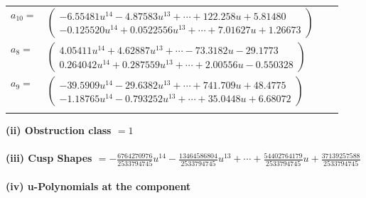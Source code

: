 \documentclass[1p]{elsarticle_modified}
\theoremstyle{definition}
\begin{document}
\begin{tabular}{m{7pt} m{180pt} m{7pt} m{180pt} }
\flushright $a_{10}=$&$\begin{pmatrix}-6.55481 u^{14}-4.87583 u^{13}+\cdots+122.258 u+5.81480\\-0.125520 u^{14}+0.0522556 u^{13}+\cdots+7.01627 u+1.26673\end{pmatrix}$ \\
\flushright $a_{8}=$&$\begin{pmatrix}4.05411 u^{14}+4.62887 u^{13}+\cdots-73.3182 u-29.1773\\0.264042 u^{14}+0.287559 u^{13}+\cdots+2.00556 u-0.550328\end{pmatrix}$ \\
\flushright $a_{9}=$&$\begin{pmatrix}-39.5909 u^{14}-29.6382 u^{13}+\cdots+741.709 u+48.4775\\-1.18765 u^{14}-0.793252 u^{13}+\cdots+35.0448 u+6.68072\end{pmatrix}$\\&\end{tabular}
\flushleft \textbf{(ii) Obstruction class $= 1$}\\~\\
\flushleft \textbf{(iii) Cusp Shapes $= -\frac{6764270976}{2533794745} u^{14}-\frac{13464586804}{2533794745} u^{13}+\cdots+\frac{54402764179}{2533794745} u+\frac{37139257588}{2533794745}$}\\~\\
\newpage\renewcommand{\arraystretch}{1}
\flushleft \textbf{(iv) u-Polynomials at the component}\newline \\
\end{document}
